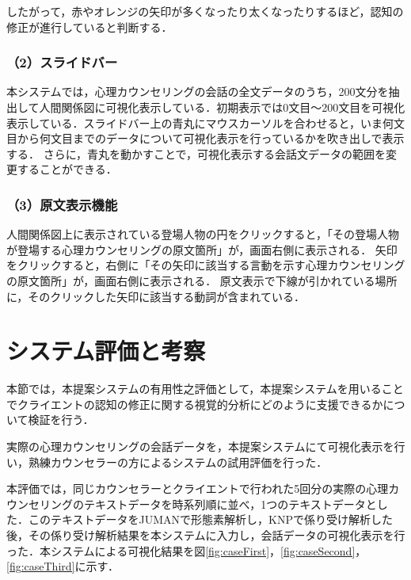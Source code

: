 \documentclass[shuuron]{kuee}
\begin{document}
したがって，赤やオレンジの矢印が多くなったり太くなったりするほど，認知の修正が進行していると判断する．

\subsubsection{（2）スライドバー}

本システムでは，心理カウンセリングの会話の全文データのうち，200文分を抽出して人間関係図に可視化表示している．初期表示では0文目〜200文目を可視化表示している．スライドバー上の青丸にマウスカーソルを合わせると，いま何文目から何文目までのデータについて可視化表示を行っているかを吹き出しで表示する．
さらに，青丸を動かすことで，可視化表示する会話文データの範囲を変更することができる．


\subsubsection{（3）原文表示機能}

人間関係図上に表示されている登場人物の円をクリックすると，「その登場人物が登場する心理カウンセリングの原文箇所」が，画面右側に表示される．
矢印をクリックすると，右側に「その矢印に該当する言動を示す心理カウンセリングの原文箇所」が，画面右側に表示される．
原文表示で下線が引かれている場所に，そのクリックした矢印に該当する動詞が含まれている．


\section{システム評価と考察} %

本節では，本提案システムの有用性之評価として，本提案システムを用いることでクライエントの認知の修正に関する視覚的分析にどのように支援できるかについて検証を行う．



実際の心理カウンセリングの会話データを，本提案システムにて可視化表示を行い，熟練カウンセラーの方によるシステムの試用評価を行った．%

本評価では，同じカウンセラーとクライエントで行われた5回分の実際の心理カウンセリングのテキストデータを時系列順に並べ，1つのテキストデータとした．このテキストデータをJUMANで形態素解析し，KNPで係り受け解析した後，その係り受け解析結果を本システムに入力し，会話データの可視化表示を行った．本システムによる可視化結果を図\ref{fig:caseFirst}，\ref{fig:caseSecond}，\ref{fig:caseThird}に示す．
\end{document}

